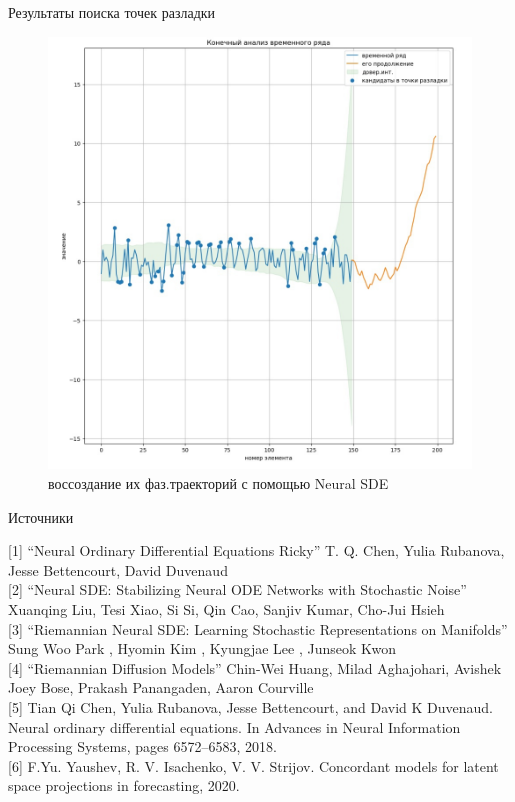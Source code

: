 \documentclass{beamer}
\begin{document}
\begin{frame}{Результаты поиска точек разладки}


\begin{figure}
\includegraphics[height=0.6\textwidth]{result.jpg}
\caption{воссоздание их фаз.траекторий с помощью Neural SDE}
\end{figure}

\end{frame}

\begin{frame}{Источники}

[1] “Neural Ordinary Differential Equations Ricky” T. Q. Chen, Yulia Rubanova, Jesse Bettencourt, David Duvenaud \\

[2] “Neural SDE: Stabilizing Neural ODE Networks with Stochastic Noise” Xuanqing Liu, Tesi Xiao, Si Si, Qin Cao, Sanjiv Kumar, Cho-Jui Hsieh  \\

[3] “Riemannian Neural SDE: Learning Stochastic Representations on Manifolds” Sung Woo Park , Hyomin Kim , Kyungjae Lee , Junseok Kwon \\

[4] “Riemannian Diffusion Models” Chin-Wei Huang, Milad Aghajohari, Avishek Joey Bose, Prakash Panangaden, Aaron Courville \\

[5] Tian Qi Chen, Yulia Rubanova, Jesse Bettencourt, and David K Duvenaud. Neural ordinary differential equations. In Advances in Neural Information Processing Systems, pages 6572–6583, 2018. \\

[6] F.Yu. Yaushev, R. V. Isachenko, V. V. Strijov. Concordant models for latent space projections in forecasting, 2020. \\

\end{frame}
\end{document}
